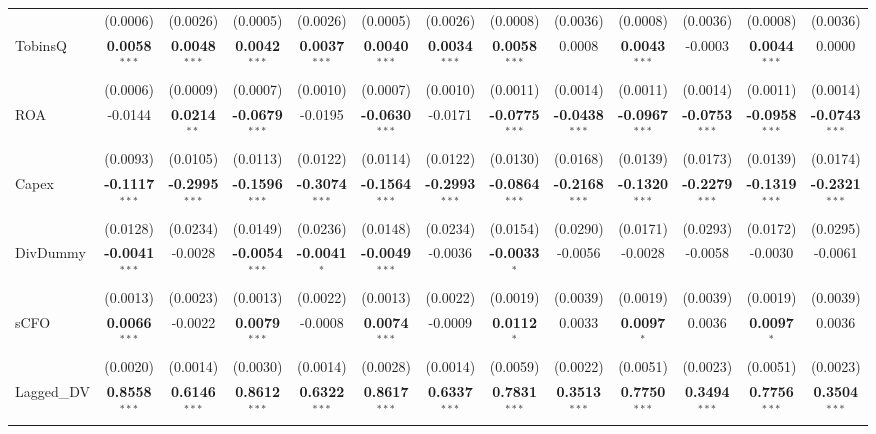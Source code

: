 \documentclass[11pt,a4paper]{article}
\begin{document}
\begin{table}[htbp]
\begin{tabular}{lcccccccccccc}
 & (0.0006) & (0.0026) & (0.0005) & (0.0026) & (0.0005) & (0.0026) & (0.0008) & (0.0036) & (0.0008) & (0.0036) & (0.0008) & (0.0036) \\
TobinsQ & \textbf{0.0058}$^{***}$ & \textbf{0.0048}$^{***}$ & \textbf{0.0042}$^{***}$ & \textbf{0.0037}$^{***}$ & \textbf{0.0040}$^{***}$ & \textbf{0.0034}$^{***}$ & \textbf{0.0058}$^{***}$ & 0.0008 & \textbf{0.0043}$^{***}$ & -0.0003 & \textbf{0.0044}$^{***}$ & 0.0000 \\
 & (0.0006) & (0.0009) & (0.0007) & (0.0010) & (0.0007) & (0.0010) & (0.0011) & (0.0014) & (0.0011) & (0.0014) & (0.0011) & (0.0014) \\
ROA & -0.0144 & \textbf{0.0214}$^{**}$ & \textbf{-0.0679}$^{***}$ & -0.0195 & \textbf{-0.0630}$^{***}$ & -0.0171 & \textbf{-0.0775}$^{***}$ & \textbf{-0.0438}$^{***}$ & \textbf{-0.0967}$^{***}$ & \textbf{-0.0753}$^{***}$ & \textbf{-0.0958}$^{***}$ & \textbf{-0.0743}$^{***}$ \\
 & (0.0093) & (0.0105) & (0.0113) & (0.0122) & (0.0114) & (0.0122) & (0.0130) & (0.0168) & (0.0139) & (0.0173) & (0.0139) & (0.0174) \\
Capex & \textbf{-0.1117}$^{***}$ & \textbf{-0.2995}$^{***}$ & \textbf{-0.1596}$^{***}$ & \textbf{-0.3074}$^{***}$ & \textbf{-0.1564}$^{***}$ & \textbf{-0.2993}$^{***}$ & \textbf{-0.0864}$^{***}$ & \textbf{-0.2168}$^{***}$ & \textbf{-0.1320}$^{***}$ & \textbf{-0.2279}$^{***}$ & \textbf{-0.1319}$^{***}$ & \textbf{-0.2321}$^{***}$ \\
 & (0.0128) & (0.0234) & (0.0149) & (0.0236) & (0.0148) & (0.0234) & (0.0154) & (0.0290) & (0.0171) & (0.0293) & (0.0172) & (0.0295) \\
DivDummy & \textbf{-0.0041}$^{***}$ & -0.0028 & \textbf{-0.0054}$^{***}$ & \textbf{-0.0041}$^{*}$ & \textbf{-0.0049}$^{***}$ & -0.0036 & \textbf{-0.0033}$^{*}$ & -0.0056 & -0.0028 & -0.0058 & -0.0030 & -0.0061 \\
 & (0.0013) & (0.0023) & (0.0013) & (0.0022) & (0.0013) & (0.0022) & (0.0019) & (0.0039) & (0.0019) & (0.0039) & (0.0019) & (0.0039) \\
sCFO & \textbf{0.0066}$^{***}$ & -0.0022 & \textbf{0.0079}$^{***}$ & -0.0008 & \textbf{0.0074}$^{***}$ & -0.0009 & \textbf{0.0112}$^{*}$ & 0.0033 & \textbf{0.0097}$^{*}$ & 0.0036 & \textbf{0.0097}$^{*}$ & 0.0036 \\
 & (0.0020) & (0.0014) & (0.0030) & (0.0014) & (0.0028) & (0.0014) & (0.0059) & (0.0022) & (0.0051) & (0.0023) & (0.0051) & (0.0023) \\
Lagged\_DV & \textbf{0.8558}$^{***}$ & \textbf{0.6146}$^{***}$ & \textbf{0.8612}$^{***}$ & \textbf{0.6322}$^{***}$ & \textbf{0.8617}$^{***}$ & \textbf{0.6337}$^{***}$ & \textbf{0.7831}$^{***}$ & \textbf{0.3513}$^{***}$ & \textbf{0.7750}$^{***}$ & \textbf{0.3494}$^{***}$ & \textbf{0.7756}$^{***}$ & \textbf{0.3504}$^{***}$ \\

\end{tabular}
\end{table}
\end{document}
